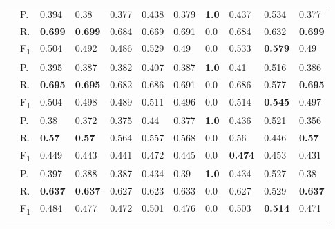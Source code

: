 \begin{tabularx}{\textwidth}{p{1.3em}l Z  Z  Z  Z  Z  Z  Z  Z  Z }
    & P.    & 0.394    & 0.38    & 0.377    & 0.438    & 0.379    & \textbf{ 1.0 }    & 0.437    & 0.534    & 0.377 \\
    & R.    & \textbf{ 0.699 }    & \textbf{ 0.699 }    & 0.684    & 0.669    & 0.691    & 0.0    & 0.684    & 0.632    & \textbf{ 0.699 } \\
    & F\textsubscript{1}    & 0.504    & 0.492    & 0.486    & 0.529    & 0.49    & 0.0    & 0.533    & \textbf{ 0.579 }    & 0.49 \\
     \midrule {}

    & P.    & 0.395    & 0.387    & 0.382    & 0.407    & 0.387    & \textbf{ 1.0 }    & 0.41    & 0.516    & 0.386 \\
    & R.    & \textbf{ 0.695 }    & \textbf{ 0.695 }    & 0.682    & 0.686    & 0.691    & 0.0    & 0.686    & 0.577    & \textbf{ 0.695 } \\
    & F\textsubscript{1}    & 0.504    & 0.498    & 0.489    & 0.511    & 0.496    & 0.0    & 0.514    & \textbf{ 0.545 }    & 0.497 \\
     \midrule {}

    & P.    & 0.38    & 0.372    & 0.375    & 0.44    & 0.377    & \textbf{ 1.0 }    & 0.436    & 0.521    & 0.356 \\
    & R.    & \textbf{ 0.57 }    & \textbf{ 0.57 }    & 0.564    & 0.557    & 0.568    & 0.0    & 0.56    & 0.446    & \textbf{ 0.57 } \\
    & F\textsubscript{1}    & 0.449    & 0.443    & 0.441    & 0.472    & 0.445    & 0.0    & \textbf{ 0.474 }    & 0.453    & 0.431 \\
     \midrule {}

    & P.    & 0.397    & 0.388    & 0.387    & 0.434    & 0.39    & \textbf{ 1.0 }    & 0.434    & 0.527    & 0.38 \\
    & R.    & \textbf{ 0.637 }    & \textbf{ 0.637 }    & 0.627    & 0.623    & 0.633    & 0.0    & 0.627    & 0.529    & \textbf{ 0.637 } \\
    & F\textsubscript{1}    & 0.484    & 0.477    & 0.472    & 0.501    & 0.476    & 0.0    & 0.503    & \textbf{ 0.514 }    & 0.471 \\
     \midrule {}

\end{tabularx}